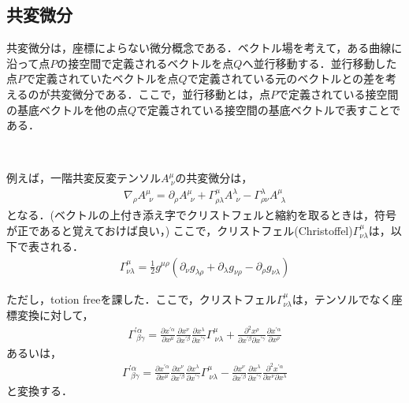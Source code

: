 \subsection{共変微分}
共変微分は，座標によらない微分概念である．ベクトル場を考えて，ある曲線に沿って点$P$の接空間で定義されるベクトルを点$Q$へ並行移動する．並行移動した点$P$で定義されていたベクトルを点$Q$で定義されている元のベクトルとの差を考えるのが共変微分である．ここで，並行移動とは，点$P$で定義されている接空間の基底ベクトルを他の点$Q$で定義されている接空間の基底ベクトルで表すことである．
\begin{empheqboxed}
\

例えば，一階共変反変テンソル$A^{\mu}_{\ \nu}$の共変微分は，
\begin{eqnarray}
\nabla_{\rho}A^{\mu}_{\ \ \nu}=\partial_{\rho}A^{\mu}_{\ \ \nu}+\Gamma^{\mu}_{\rho\lambda}A^{\lambda}_{\ \ \nu}-\Gamma^{\lambda}_{\rho\nu}A^{\mu}_{\ \ \lambda}
\end{eqnarray}
となる．(ベクトルの上付き添え字でクリストフェルと縮約を取るときは，符号が正であると覚えておけば良い，)
ここで，クリストフェル(Christoffel)$\Gamma^{\mu}_{\nu\lambda}$は，以下で表される．
\begin{eqnarray}
\label{Ch}
\Gamma^{\mu}_{\nu\lambda}=\frac{1}{2}g^{\mu\rho}(\partial_\nu g_{\lambda\rho}+\partial_\lambda g_{\nu\rho} - \partial_\rho g_{\nu\lambda})
\end{eqnarray}

\end{empheqboxed}
ただし，totion freeを課した．ここで，クリストフェル$\Gamma^{\mu}_{\nu\lambda}$は，テンソルでなく座標変換に対して，
\begin{eqnarray}
\Gamma^{\prime \alpha}_{\ \beta\gamma}=\frac{\partial x^{\prime\alpha}}{\partial x^{\mu}}\frac{\partial x^{\nu}}{\partial x^{\prime\beta}}\frac{\partial x^{\lambda}}{\partial x^{\prime\gamma}}\Gamma^{\mu}_{\ \nu\lambda}+\frac{\partial^2 x^{\rho}}{\partial x^{\prime \beta}\partial x^{\prime \gamma}}\frac{\partial x^{\prime \alpha}}{\partial x^{\rho}}
\end{eqnarray}
あるいは，
\begin{eqnarray}
\Gamma^{\prime \alpha}_{\ \beta\gamma}=\frac{\partial x^{\prime\alpha}}{\partial x^{\mu}}\frac{\partial x^{\nu}}{\partial x^{\prime\beta}}\frac{\partial x^{\lambda}}{\partial x^{\prime\gamma}}\Gamma^{\mu}_{\ \nu\lambda}-\frac{\partial x^{\nu}}{\partial x^{\prime\beta}}\frac{\partial x^{\lambda}}{\partial x^{\prime\gamma}}\frac{\partial^2 x^{\prime \alpha}}{\partial x^{\nu}\partial x^{\lambda}}
\end{eqnarray}
と変換する．

